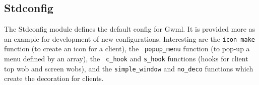 \documentclass{book}
\begin{document}
   \subsection{\bf Stdconfig}

  The Stdconfig module defines the default config for Gwml. It is provided 
more as an example for development of new configurations. Interesting are 
the {\tt icon\_make} function (to create an icon for a client), the {\tt 
popup\_menu} function (to pop-up a menu defined by an array), the {\tt 
c\_hook} and {\tt s\_hook} functions (hooks for client top wob and screen wobs),
and the {\tt simple\_window} and {\tt no\_deco} functions which create
the decoration for clients.
\end{document}
